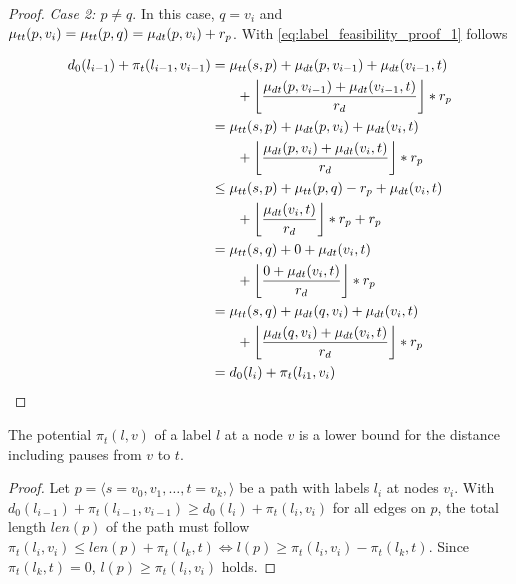 \begin{proof}
	\emph{Case 2: $p \neq q$}. In this case, $q = v_i$ and $\mu_{tt}(p,v_i) = \mu_{tt}(p,q) = \mu_{dt}(p,v_i) + r_p$. With \ref{eq:label_feasibility_proof_1} follows

	\begin{align}
		\begin{split}\label{eq:label_feasibility_proof_4}
			d_0(l_{i-1}) + \pi_t(l_{i-1},v_{i-1}) &= \traveltime(s,p) + \drivingtime(p,v_{i-1}) + \drivingtime(v_{i-1},t)\\
			& \phantom{{}=1} + \floor*{ \frac{\drivingtime(p,v_{i-1}) + \drivingtime(v_{i-1},t)}{\restr_d} } * \restr_p\\
			&= \traveltime(s,p) + \drivingtime(p,v_{i}) + \drivingtime(v_{i},t)\\
			& \phantom{{}=1} + \floor*{ \frac{\drivingtime(p,v_{i}) + \drivingtime(v_{i},t)}{\restr_d} } * \restr_p\\
			&\le \traveltime(s,p) + \traveltime(p,q) - \restr_p + \drivingtime(v_{i},t)\\
			& \phantom{{}=1} + \floor*{ \frac{\drivingtime(v_{i},t)}{\restr_d} } * \restr_p + \restr_p\\
			&= \traveltime(s,q) + 0 + \drivingtime(v_{i},t)\\
			& \phantom{{}=1} + \floor*{ \frac{0 + \drivingtime(v_{i},t)}{\restr_d} } * \restr_p\\
			&= \traveltime(s,q) + \drivingtime(q,v_{i}) + \drivingtime(v_{i},t)\\
			& \phantom{{}=1} + \floor*{ \frac{\drivingtime(q,v_{i}) + \drivingtime(v_{i},t)}{\restr_d} } * \restr_p\\
			&= d_0(l_{i}) + \pi_t(l_{i1},v_{i})
		\end{split}
	\end{align}
\end{proof}

\begin{lemma}\label{lemma:pot_lower_bound_csp}
	The potential $\pi_t(l,v)$ of a label $l$ at a node $v$ is a lower bound for the distance including pauses from $v$ to $t$.
\end{lemma}

\begin{proof}
	Let $p = \langle s=v_0,v_1,\ldots,t=v_k, \rangle$ be a path with labels $l_i$ at nodes $v_i$. With $d_0(l_{i-1}) + \pi_t(l_{i-1},v_{i-1}) \ge d_0(l_{i}) + \pi_t(l_i,v_i)$ for all edges on $p$, the total length $len(p)$ of the path must follow $\pi_t(l_i,v_i) \le len(p) + \pi_t(l_k,t) \Leftrightarrow l(p) \ge \pi_t(l_i,v_i) - \pi_t(l_k,t)$. Since $\pi_t(l_k,t) = 0$, $l(p) \ge \pi_t(l_i,v_i)$ holds.
\end{proof}

